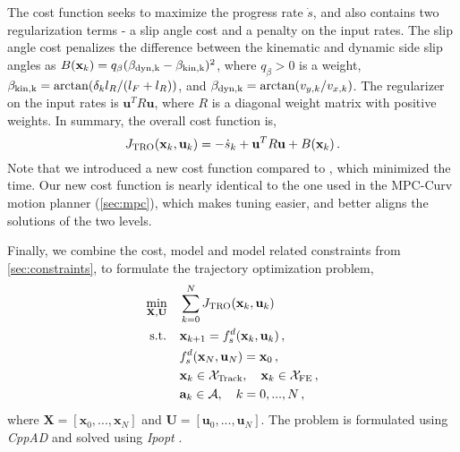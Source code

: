 The cost function seeks to maximize the progress rate $\dot{s}$, and also contains two regularization terms - a slip angle cost and a penalty on the input rates. The slip angle cost penalizes the difference between the kinematic and dynamic side slip angles as $B(\mathbf{{x}}_k) = q_\beta(\beta_{\rm{dyn},k} - \beta_{\rm{kin},k})^2$,
where $q_\beta > 0$ is a weight, $\beta_{\rm{kin},k} = \arctan (\delta_k l_R /(l_F + l_R))$, and $\beta_{\rm{dyn},k} = \arctan (v_{y,k} / v_{x,k})$. The regularizer on the input rates is $\mathbf{u}^T R \mathbf{u}$, where $R$ is a diagonal weight matrix with positive weights. In summary, the overall cost function is, 
\begin{equation}
\label{eq:tro_cost}
    J_{\rm{TRO}}(\mathbf{{x}}_k, \mathbf{u}_k) = -\dot{s}_k + \mathbf{u}^T R \mathbf{u} + B(\mathbf{{x}}_k) \,.
\end{equation}
Note that we introduced a new cost function compared to \cite{vazquez2020optimization}, which minimized the time. Our new cost function is nearly identical to the one used in the MPC-Curv motion planner (\cref{sec:mpc}), which makes tuning easier, and better aligns the solutions of the two levels.  

Finally, we combine the cost, model and model related constraints from \cref{sec:constraints}, to formulate the trajectory optimization problem,
\begin{equation}
\begin{aligned}
& \underset{\mathbf{{X}},\mathbf{U}}{\text{min}}
    && \sum_{k=0}^{N} J_{\rm{TRO}}(\mathbf{{x}}_k, \mathbf{u}_k) \\
& \; \text{s.t.}
    && \mathbf{{x}}_{k+1} = f_s^d(\mathbf{{x}}_k, \mathbf{u}_k)\,,\\
&&& f_s^d(\mathbf{{x}}_N, \mathbf{u}_N) = \mathbf{{x}}_{0} \,,\\
&&& \mathbf{{x}}_k \in \mathcal{X}_{\text{Track}}, \quad \mathbf{{x}}_k \in \mathcal{X}_{\text{FE}} \,,\\
&&& \mathbf{a}_k \in \mathcal{A}, \quad k = 0,...,N \,,
\label{eq:TRO}
\end{aligned}
\end{equation}
where $\mathbf{{X}} = [\mathbf{{x}}_0,...,\mathbf{{x}}_N]$ and $\mathbf{{U}} = [\mathbf{{u}}_0,...,\mathbf{{u}}_N]$. The problem is formulated using \emph{CppAD} \cite{CppAD} and solved using \emph{Ipopt} \cite{ipopt}.

